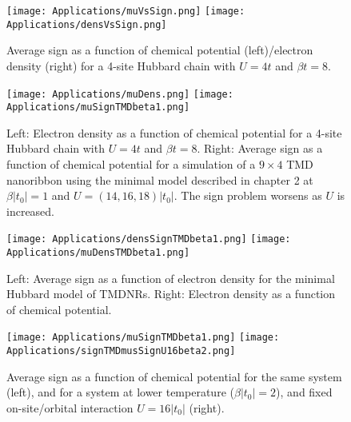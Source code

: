 \begin{figure}[H]
\texttt{[image: Applications/muVsSign.png]}
\texttt{[image: Applications/densVsSign.png]}
	\caption[Average sign as a function of chemical potential/electron density for a 4-site Hubbard chain.]{Average sign as a function of chemical potential (left)/electron density (right) for a 4-site Hubbard chain with $U = 4 t$ and $\beta t = 8$.}
	\label{fig:signMuDens}
\end{figure}
\begin{figure}[H]
\texttt{[image: Applications/muDens.png]}
\texttt{[image: Applications/muSignTMDbeta1.png]}
	\caption[Electron density as a function of chemical potential for a 4-site Hubbard chain. Average sign as a function of chemical potential for a simulation of a $9 \times 4$ TMD nanoribbon using the minimal model described in chapter 2.]{Left: Electron density as a function of chemical potential for a 4-site Hubbard chain with $U = 4 t$ and $\beta t = 8$.
	Right: Average sign as a function of chemical potential for a simulation of a $9 \times 4$ TMD nanoribbon using the minimal model described in chapter 2 at $\beta |t_0| = 1 $ and $U = (14, 16, 18)|t_0|$.
	The sign problem worsens as $U$ is increased.}
	\label{fig:muSign}
\end{figure}
\begin{figure}[H]
\texttt{[image: Applications/densSignTMDbeta1.png]}
\texttt{[image: Applications/muDensTMDbeta1.png]}
	\caption[Average sign as a function of electron density for the minimal Hubbard model of \acs{TMDNR}s. Electron density as a function of chemical potential.]{Left: Average sign as a function of electron density for the minimal Hubbard model of \acs{TMDNR}s. Right: Electron density as a function of chemical potential.}
	\label{fig:densSignmuDens}
\end{figure}
\begin{figure}[H]
\texttt{[image: Applications/muSignTMDbeta1.png]}
\texttt{[image: Applications/signTMDmusSignU16beta2.png]}
	\caption[Average sign as a function of chemical potential for the same system, and for a system at lower temperature ($\beta |t_0 | = 2$), and fixed on-site/orbital interaction $U = 16|t_0|$.]{Average sign as a function of chemical potential for the same system (left), and for a system at lower temperature ($\beta |t_0| = 2$), and fixed on-site/orbital interaction $U = 16|t_0|$ (right).}
	\label{fig:muDensU16signDens}
\end{figure}
